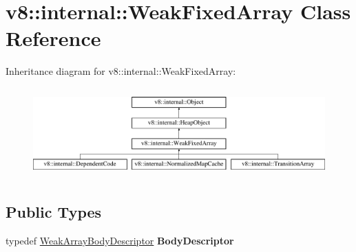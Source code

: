 \hypertarget{classv8_1_1internal_1_1WeakFixedArray}{}\section{v8\+:\+:internal\+:\+:Weak\+Fixed\+Array Class Reference}
\label{classv8_1_1internal_1_1WeakFixedArray}
Inheritance diagram for v8\+:\+:internal\+:\+:Weak\+Fixed\+Array\+:\begin{figure}[H]
\begin{center}
\leavevmode
\includegraphics[height=3.505477cm]{classv8_1_1internal_1_1WeakFixedArray}
\end{center}
\end{figure}
\subsection*{Public Types}
\begin{DoxyCompactItemize}
\item 
\mbox{\label{classv8_1_1internal_1_1WeakFixedArray_afcabe664667c07998b8ac88e673e536f}} 
typedef \mbox{\hyperlink{classv8_1_1internal_1_1FlexibleWeakBodyDescriptor}{Weak\+Array\+Body\+Descriptor}} {\bfseries Body\+Descriptor}
\end{DoxyCompactItemize}
